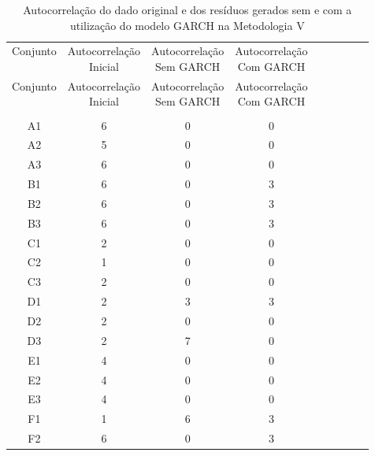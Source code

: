 \begin{center}
\begin{longtable}{ccccc|cccc}
\toprule
\rowcolor{white}
\caption[Metodologia V: evolução da autocorrelação]{Autocorrelação do dado
original e dos resíduos gerados sem e com a utilização do modelo GARCH na
Metodologia V} \label{tab:EvolucaoAutocorrelacaoMet5}\\
\midrule
Conjunto & \specialcell{Autocorrelação\\Inicial} & \specialcell{Autocorrelação\\Sem
GARCH} & \specialcell{Autocorrelação\\Com GARCH} \\
\midrule
\endfirsthead 
\midrule
\rowcolor{white}
Conjunto & \specialcell{Autocorrelação\\Inicial} & \specialcell{Autocorrelação\\Sem
GARCH} & \specialcell{Autocorrelação\\Com GARCH} \\
\toprule
\endhead
\midrule \\ %
\endfoot
\bottomrule 
\endlastfoot
    A1    & 6     & 0     & 0 \\
    A2    & 5     & 0     & 0 \\
    A3    & 6     & 0     & 0 \\
    B1    & 6     & 0     & 3 \\
    B2    & 6     & 0     & 3 \\
    B3    & 6     & 0     & 3 \\
    C1    & 2     & 0     & 0 \\
    C2    & 1     & 0     & 0 \\
    C3    & 2     & 0     & 0 \\
    D1    & 2     & 3     & 3 \\
    D2    & 2     & 0     & 0 \\
    D3    & 2     & 7     & 0 \\
    E1    & 4     & 0     & 0 \\
    E2    & 4     & 0     & 0 \\
    E3    & 4     & 0     & 0 \\
    F1    & 1     & 6     & 3 \\
    F2    & 6     & 0     & 3 \\

\end{longtable}
\end{center}

